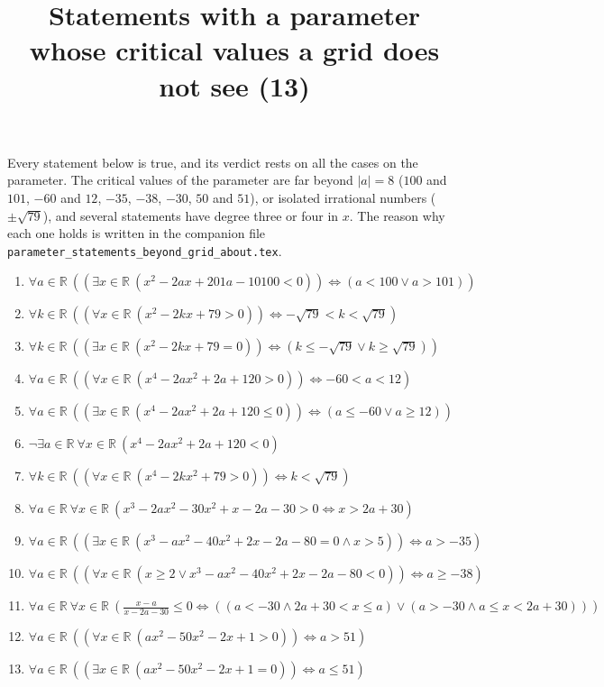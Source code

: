 \documentclass[11pt,a4paper]{article}
\title{Statements with a parameter whose critical values a grid does not see (13)}
\author{}
\date{}
\begin{document}
\maketitle
Every statement below is true, and its verdict rests on all the cases on the parameter. The critical values of the parameter are far beyond $|a| = 8$ ($100$ and $101$, $-60$ and $12$, $-35$, $-38$, $-30$, $50$ and $51$), or isolated irrational numbers ($\pm\sqrt{79}$), and several statements have degree three or four in $x$. The reason why each one holds is written in the companion file \texttt{parameter\_statements\_beyond\_grid\_about.tex}.

\begin{enumerate}
\item $\displaystyle \forall a \in \mathbb{R}\ \left( \left( \exists x \in \mathbb{R}\ (x^{2} - 2ax + 201a - 10100 < 0) \right) \iff (a < 100 \lor a > 101) \right)$
\item $\displaystyle \forall k \in \mathbb{R}\ \left( \left( \forall x \in \mathbb{R}\ (x^{2} - 2kx + 79 > 0) \right) \iff -\sqrt{79} < k < \sqrt{79} \right)$
\item $\displaystyle \forall k \in \mathbb{R}\ \left( \left( \exists x \in \mathbb{R}\ (x^{2} - 2kx + 79 = 0) \right) \iff (k \le -\sqrt{79} \lor k \ge \sqrt{79}) \right)$
\item $\displaystyle \forall a \in \mathbb{R}\ \left( \left( \forall x \in \mathbb{R}\ (x^{4} - 2ax^{2} + 2a + 120 > 0) \right) \iff -60 < a < 12 \right)$
\item $\displaystyle \forall a \in \mathbb{R}\ \left( \left( \exists x \in \mathbb{R}\ (x^{4} - 2ax^{2} + 2a + 120 \le 0) \right) \iff (a \le -60 \lor a \ge 12) \right)$
\item $\displaystyle \lnot \exists a \in \mathbb{R}\ \forall x \in \mathbb{R}\ (x^{4} - 2ax^{2} + 2a + 120 < 0)$
\item $\displaystyle \forall k \in \mathbb{R}\ \left( \left( \forall x \in \mathbb{R}\ (x^{4} - 2kx^{2} + 79 > 0) \right) \iff k < \sqrt{79} \right)$
\item $\displaystyle \forall a \in \mathbb{R}\ \forall x \in \mathbb{R}\ (x^{3} - 2ax^{2} - 30x^{2} + x - 2a - 30 > 0 \iff x > 2a + 30)$
\item $\displaystyle \forall a \in \mathbb{R}\ \left( \left( \exists x \in \mathbb{R}\ (x^{3} - ax^{2} - 40x^{2} + 2x - 2a - 80 = 0 \land x > 5) \right) \iff a > -35 \right)$
\item $\displaystyle \forall a \in \mathbb{R}\ \left( \left( \forall x \in \mathbb{R}\ (x \ge 2 \lor x^{3} - ax^{2} - 40x^{2} + 2x - 2a - 80 < 0) \right) \iff a \ge -38 \right)$
\item $\displaystyle \forall a \in \mathbb{R}\ \forall x \in \mathbb{R}\ \left( \frac{x - a}{x - 2a - 30} \le 0 \iff \left( (a < -30 \land 2a + 30 < x \le a) \lor (a > -30 \land a \le x < 2a + 30) \right) \right)$
\item $\displaystyle \forall a \in \mathbb{R}\ \left( \left( \forall x \in \mathbb{R}\ (ax^{2} - 50x^{2} - 2x + 1 > 0) \right) \iff a > 51 \right)$
\item $\displaystyle \forall a \in \mathbb{R}\ \left( \left( \exists x \in \mathbb{R}\ (ax^{2} - 50x^{2} - 2x + 1 = 0) \right) \iff a \le 51 \right)$
\end{enumerate}
\end{document}

